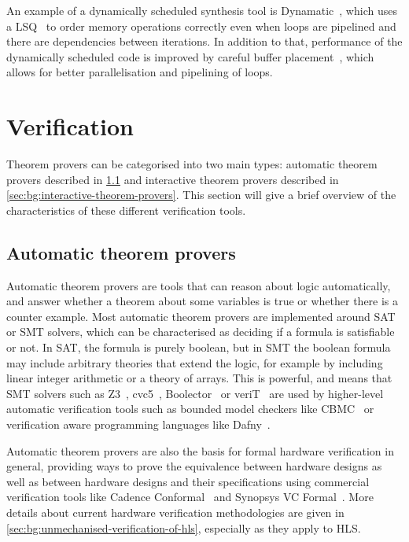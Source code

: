 An example of a dynamically scheduled synthesis tool is
Dynamatic~\cite{josipović18_dynam_sched_high_synth}, which uses a
\gls{LSQ}~\cite{josipovic17_out_of_order_load_store} to order memory operations
correctly even when loops are pipelined and there are dependencies between
iterations.  In addition to that, performance of the dynamically scheduled code
is improved by careful buffer
placement~\cite{josipovic20_buffer_placem_sizin_high_perfor_dataf_circuit},
which allows for better parallelisation and pipelining of loops.

\section{Verification}%
\label{sec:bg:verification}

Theorem provers can be categorised into two main types: automatic theorem
provers described in \cref{sec:bg:automatic-theorem-provers} and interactive
theorem provers described in \cref{sec:bg:interactive-theorem-provers}.  This
section will give a brief overview of the characteristics of these different
verification tools.

\subsection{Automatic theorem provers}%
\label{sec:bg:automatic-theorem-provers}

Automatic theorem provers are tools that can reason about logic automatically,
and answer whether a theorem about some variables is true or whether there is a
counter example.  Most automatic theorem provers are implemented around
\gls{SAT} or \gls{SMT} solvers, which can be characterised as deciding if a
formula is satisfiable or not.  In \gls{SAT}, the formula is purely boolean, but
in \gls{SMT} the boolean formula may include arbitrary theories that extend the
logic, for example by including linear integer arithmetic or a theory of arrays.
This is powerful, and means that \gls{SMT} solvers such as
Z3~\cite[]{moura08_z}, cvc5~\cite[]{barbosa22_cvc5},
Boolector~\cite[]{brummayer09_b} or veriT~\cite{bouton09} are used by
higher-level automatic verification tools such as bounded model checkers like
CBMC~\cite[]{kroening14_c} or verification aware programming languages like
Dafny~\cite[]{leino10_d}.

Automatic theorem provers are also the basis for formal hardware verification in
general, providing ways to prove the equivalence between hardware designs as
well as between hardware designs and their specifications using commercial
verification tools like Cadence Conformal~\cite[]{cadence23_c} and Synopsys VC
Formal~\cite[]{synopsys23_v}.  More details about current hardware verification
methodologies are given in \cref{sec:bg:unmechanised-verification-of-hls},
especially as they apply to \gls{HLS}.

